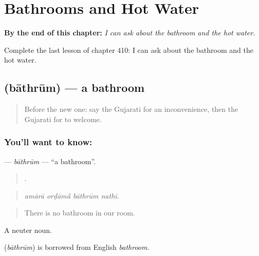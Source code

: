 
\chapter{Bathrooms and Hot Water}
\label{ch:gu-bathrooms-and-hot-water}

\begin{chapteropening}
\textbf{By the end of this chapter:} \emph{I can ask about the bathroom and the hot water.}

Complete the last lesson of chapter 410: I can ask about the bathroom and the hot water.
\end{chapteropening}

\section[\texorpdfstring{\gu{બાથરૂમ} (bāthrūm)}{બાથરૂમ (bāthrūm)}]{ (bāthrūm) — a bathroom}

\label{lesson:GU-C410-bathrum}



\begin{quote}
Before the new one: say the Gujarati for an inconvenience, then the Gujarati for to welcome.
\end{quote}

\subsection*{You'll want to know: }
\textbf{} — \emph{bāthrūm} — \textquotedblleft{}a bathroom\textquotedblright{}.

\begin{quote}
   .
\end{quote}

\begin{quote}
\emph{amārā orḍāmā̃ bāthrūm nathī.}
\end{quote}

\begin{quote}
There is no bathroom in our room.
\end{quote}

A neuter noun.

\begin{cousinweb}
\textbf{} (\emph{bāthrūm}) is borrowed from English \emph{bathroom}.
\end{cousinweb}

